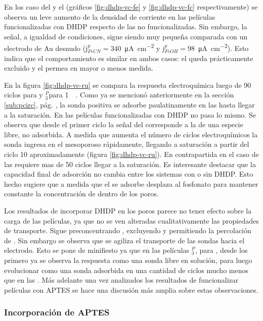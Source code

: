 		    En los caso del \fe\space y el \fc\space (gráficos \ref{fig:dhdp-vc-fe} y \ref{fig:dhdp-vc-fc} respectivamente) se observa un leve aumento de la densidad de corriente en las películas funcionalizadas con DHDP respecto de las no funcionalizadas. Sin embargo, la señal, a igualdad de condiciones, sigue siendo muy pequeña comparada con un electrodo de Au desnudo (j$^p_{FeCN}\!=$\SI{340}{\micro\ampere\per\square\cm} y j$^p_{FcOH}\!=$\SI{98}{\micro\ampere\per\square\cm}). Esto indica que el comportamiento es similar en ambos casos: el \fe\space queda prácticamente excluido y el \fc\space permea en mayor o menos medida.

		    En la figura \ref{fig:dhdp-vc-ru} se compara la respuesta electroquímica luego de 90 ciclos para \pdmZ\space y \pdmZ$^P_3$\space para \ru\space \SI{1}{\milli\Molar}. Como ya se mencionó anteriormente en la sección \ref{sub:pcirc}, pág. \pageref{sub:pcirc}, la sonda positiva se adsorbe paulatinamente en las \pdmZ\space hasta llegar a la saturación. En las películas funcionalizadas con DHDP no pasa lo mismo. Se observa que desde el primer ciclo la señal del \ru\space corresponde a la de una especie libre, no adsorbida. A medida que aumenta el número de ciclos electroquímicos la sonda ingresa en el mesoporoso rápidamente, llegando a saturación a partir del ciclo 10 aproximadamente (figura \ref{fig:dhdp-vc-ru}). En contrapartida en el caso de las \pdmZ\space requiere mas de 50 ciclos llegar a la saturación. Es interesante destacar que la capacidad final de adsorción no cambia entre los sistemas con o sin DHDP. Esto hecho sugiere que a medida que el \ru\space se adsorbe desplaza al fosfonato para mantener constante la concentración de \ru\space dentro de los poros.

		    Los resultados de incorporar DHDP en los poros parece no tener efecto sobre la carga de las películas, ya que no se ven alteradas cualitativamente las propiedades de transporte. Sigue preconcentrando \ru, excluyendo \fe\space y permitiendo la percolación de \fc. Sin embargo se observa que se agiliza el transporte de las sondas hacia el electrodo. Esto se pone de minifiesto ya que en las películas \pdmZ$^P_3$, para \ru,  desde los primero ya se observa la respuesta como una sonda libre en solución, para luego evolucionar como una sonda adsorbida en una cantidad de ciclos mucho menos que en las \pdmZ. Más adelante una vez analizados los resultados de funcionalizar películas con APTES se hace una discusión más amplia sobre estas observaciones.
			

		\subsubsection{Incorporación de APTES}
			
